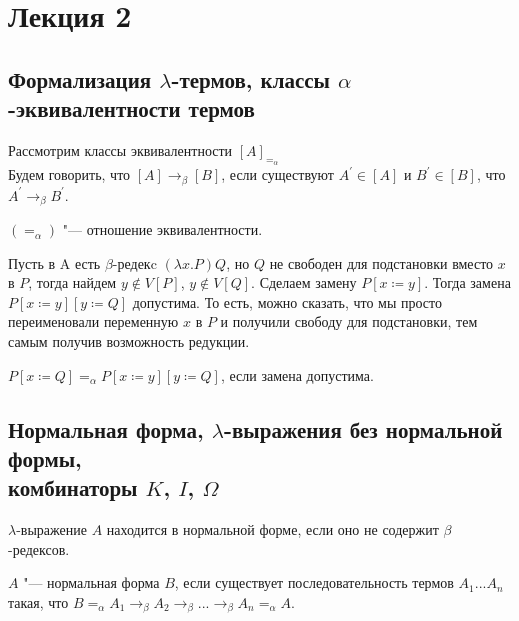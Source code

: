 \section{Лекция 2}

\subsection{Формализация $\lambda$-термов, классы $\alpha$-эквивалентности термов}

\begin{definition}
	Рассмотрим классы эквивалентности $[A]_{=_{\alpha}}$ \\
	Будем говорить, что $[A]\to_{\beta}[B]$, если  существуют $A^{'}\in [A]$ и $B^{'} \in [B]$, что $A^{'}\to_{\beta}B^{'}$.
\end{definition}

\begin{lemma}
	$(=_{\alpha})$ "--- отношение эквивалентности.
\end{lemma}

Пусть в A есть $\beta$-редекc $(\lambda{}x.P)Q$, но $Q$ не свободен для подстановки вместо $x$ в $P$,
тогда найдем $y\notin V[P]$, $y\notin V[Q]$. Сделаем замену $P[x\coloneqq{}y]$.
Тогда замена $P[x\coloneqq{}y][y\coloneqq{}Q]$ допустима. То есть, можно сказать, что мы просто переименовали переменную $x$ в $P$ и получили свободу для подстановки, тем самым получив возможность редукции.

\begin{lemma}
	$P[x\coloneqq{}Q]=_{\alpha}P[x\coloneqq{}y][y\coloneqq{}Q]$, если замена допустима.
\end{lemma}

\subsection{Нормальная форма, $\lambda$-выражения без нормальной формы, \\комбинаторы $K$, $I$, $\Omega$}

\begin{definition}
	$\lambda$-выражение $A$ находится в нормальной форме, если оно не содержит $\beta$-редексов.
\end{definition}

\begin{definition}
	$A$ "--- нормальная форма $B$, если существует последовательность термов $A_{1}...A_{n}$ такая, что $B=_{\alpha}A_{1}\to_{\beta}A_{2}\to_{\beta}...\to_{\beta}A_{n}=_{\alpha}A$.
\end{definition}


